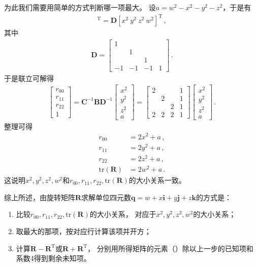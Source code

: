 为此我们需要用简单的方式判断哪一项最大。
设$a=w^2-x^2-y^2-z^2$，于是有
\begin{align}
    [x^2\ y^2\ z^2\ a]^\mathrm{T}=\bm D[x^2\ y^2\ z^2\ w^2]^\mathrm{T}\, ,
\end{align}
其中
\begin{align}
    \bm D=\left[\begin{array}{rrrr}
            1  &    &    &   \\
               & 1  &    &   \\
               &    & 1  &   \\
            -1 & -1 & -1 & 1
        \end{array}\right]\, .
\end{align}
于是联立可解得
\begin{align}
    \left[\begin{array}{c}
            r_{00} \\r_{11}\\r_{22}\\1
        \end{array}\right]=\bm C^{-1}\bm B\bm D^{-1}\left[\begin{array}{c}
            x^2 \\ y^2\\ z^2\\ a
        \end{array}\right]=\left[\begin{array}{cccc}
            2 &   &   & 1 \\
              & 2 &   & 1 \\
              &   & 2 & 1 \\
            2 & 2 & 2 & 1
        \end{array}\right]\left[\begin{array}{c}
            x^2 \\ y^2\\ z^2\\ a
        \end{array}\right]\, .
\end{align}
整理可得
\begin{align}
    r_{00}             & =2x^2+a\, , \\
    r_{11}             & =2y^2+a\, , \\
    r_{22}             & =2z^2+a\, , \\
    \mathrm{tr}(\bm R) & =2w^2+a\, .
\end{align}
这说明$x^2,y^2,z^2,w^2$和$r_{00},r_{11},r_{22},\mathrm{tr}(\bm R)$的大小关系一致。

综上所述，由旋转矩阵$\bm R$求解单位四元数$\bm q=w+x\mathbf{i}+y\mathbf{j}+z\mathbf{k}$的方式是：
\begin{enumerate}
    \item 比较$r_{00},r_{11},r_{22},\mathrm{tr}(\bm R)$的大小关系，
          对应于$x^2,y^2,z^2,w^2$的大小关系；
    \item 取最大的那项，按对应行计算该项并开方；
    \item 计算$\bm R-\bm R^\mathrm{T}$或$\bm R+\bm R^\mathrm{T}$，
          分别用所得矩阵的元素（）除以上一步的已知项和系数4得到剩余未知项。
\end{enumerate}